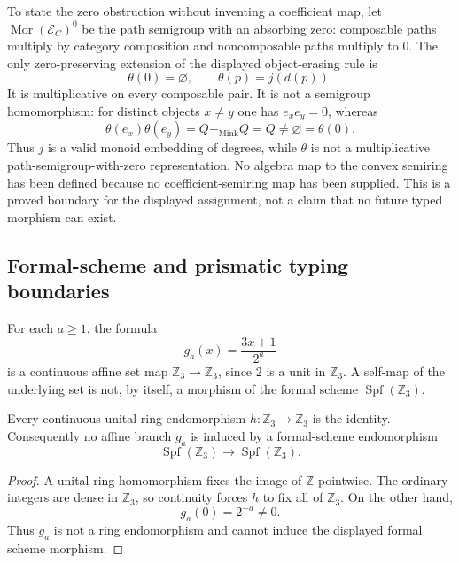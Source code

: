 \begin{sourceissue}
To state the zero obstruction without inventing a coefficient map, let
$\operatorname{Mor}(\mathcal E_C)^0$ be the path semigroup with an absorbing
zero: composable paths multiply by category composition and noncomposable
paths multiply to $0$.  The only zero-preserving extension of the displayed
object-erasing rule is
\[
 \theta(0)=\varnothing,
 \qquad \theta(p)=j(d(p)).
\]
It is multiplicative on every composable pair.  It is not a semigroup
homomorphism: for distinct objects $x\ne y$ one has $e_xe_y=0$, whereas
\[
 \theta(e_x)\theta(e_y)=Q+_{\mathrm{Mink}}Q=Q\ne\varnothing=\theta(0).
\]
Thus $j$ is a valid monoid embedding of degrees, while $\theta$ is not a
multiplicative path-semigroup-with-zero representation.  No algebra map to
the convex semiring has been defined because no coefficient-semiring map has
been supplied.  This is a proved boundary for the displayed assignment, not
a claim that no future typed morphism can exist.
\end{sourceissue}

\subsection{Formal-scheme and prismatic typing boundaries}

For each $a\geq1$, the formula
\[
 g_a(x)=\frac{3x+1}{2^a}
\]
is a continuous affine set map $\mathbb Z_3\to\mathbb Z_3$, since $2$ is a
unit in $\mathbb Z_3$.  A self-map of the underlying set is not, by itself, a
morphism of the formal scheme $\operatorname{Spf}(\mathbb Z_3)$.

\begin{theorem}
\label{thm:no-collatz-branch-on-spf-zthree}
Every continuous unital ring endomorphism
$h\colon\mathbb Z_3\to\mathbb Z_3$ is the identity.  Consequently no affine
branch $g_a$ is induced by a formal-scheme endomorphism
\[
 \operatorname{Spf}(\mathbb Z_3)
 \longrightarrow
 \operatorname{Spf}(\mathbb Z_3).
\]
\end{theorem}

\begin{proof}
A unital ring homomorphism fixes the image of $\mathbb Z$ pointwise.  The
ordinary integers are dense in $\mathbb Z_3$, so continuity forces $h$ to fix
all of $\mathbb Z_3$.  On the other hand,
\[
 g_a(0)=2^{-a}\ne0.
\]
Thus $g_a$ is not a ring endomorphism and cannot induce the displayed formal
scheme morphism.
\end{proof}

